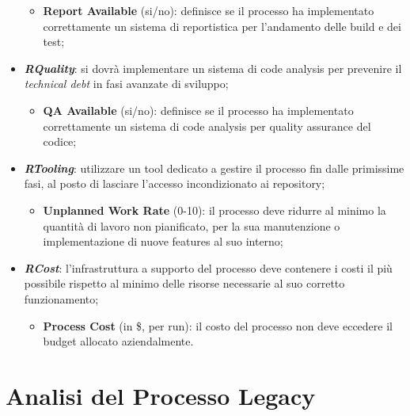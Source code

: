 \documentclass[../main.tex]{subfiles}
\begin{document}
\begin{itemize}
    	        \begin{itemize}
    	            \item \textbf{Report Available} (si/no): definisce se il processo ha implementato correttamente un sistema di reportistica per l'andamento delle build e dei test;
    	        \end{itemize}
    	        \item \textbf{\emph{RQuality}}: si dovrà implementare un sistema di code analysis per prevenire il \emph{technical debt} in fasi avanzate di sviluppo;
    	        \begin{itemize}
    	            \item \textbf{QA Available} (si/no): definisce se il processo ha implementato correttamente un sistema di code analysis per quality assurance del codice;
    	        \end{itemize}
    	        \item \textbf{\emph{RTooling}}: utilizzare un tool dedicato a gestire il processo fin dalle primissime fasi, al posto di lasciare l'accesso incondizionato ai repository;
    	        \begin{itemize}
    	            \item \textbf{Unplanned Work Rate} (0-10): il processo deve ridurre al minimo la quantità di lavoro non pianificato, per la sua manutenzione o implementazione di nuove features al suo interno;
    	        \end{itemize}
    	        \item \textbf{\emph{RCost}}: l'infrastruttura a supporto del processo deve contenere i costi il più possibile rispetto al minimo delle risorse necessarie al suo corretto funzionamento;
    	        \begin{itemize}
    	            \item \textbf{Process Cost} (in \$, per run): il costo del processo non deve eccedere il budget allocato aziendalmente.
    	        \end{itemize}
    	    \end{itemize}
    	    
    	
	    \section{Analisi del Processo Legacy}
    	    
\end{document}
